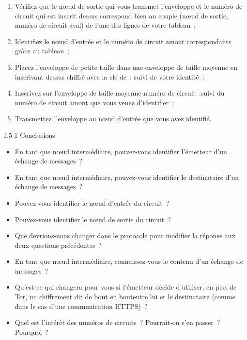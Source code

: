 \documentclass[a4paper,twoside,french]{article}
\makeatletter
\renewcommand\section{\@startsection
  {section}{1}{1cm}%
  {1.5\baselineskip}%
  {1\baselineskip}%
  {\normalfont\Large\bfseries}}%
\makeatother
\begin{document}
  \begin{enumerate}
  \item Vérifiez que le n\oe ud de sortie qui vous transmet
    l'enveloppe et le numéro de circuit qui est inscrit dessus
    correspond bien au couple (n\oe ud de sortie, numéro de circuit
    aval) de l'une des lignes de votre tableau~;
  \item Identifiez le n\oe ud d'entrée et le numéro de circuit amont
    correspondants grâce au tableau~;
  \item Placez l'enveloppe de petite taille dans une enveloppe de
    taille moyenne en inscrivant dessus \og chiffré avec la clé de~:
    \fg suivi de votre identité~;
  \item Inscrivez sur l'enveloppe de taille moyenne \og numéro de
    circuit~:\fg suivi du numéro de circuit amont que vous venez
    d'identifier~;
  \item Transmettez l'enveloppe au n\oe ud d'entrée que vous avez
    identifié.
  \end{enumerate}

  \section{Conclusions}

  \begin{itemize}
  \item En tant que n\oe ud intermédiaire, pouvez-vous identifier
    l'émetteur d'un échange de messages~?
  \item En tant que n\oe ud intermédiaire, pouvez-vous identifier
    le destinataire d'un échange de messages~?
  \item Pouvez-vous identifier le n\oe ud d'entrée du circuit~?
  \item Pouvez-vous identifier le n\oe ud de sortie du circuit~?
  \item Que devrions-nous changer dans le protocole pour modifier la
    réponse aux deux questions précédentes~?
  \item En tant que n\oe ud intermédiaire, connaissez-vous le contenu
    d'un échange de messages~?
  \item Qu'est-ce qui changera pour vous si l'émetteur décide
    d'utiliser, en plus de Tor, un chiffrement dit \og de bout en
    bout\fg entre lui et le destinataire (comme dans le cas d'une
    communication HTTPS)~?
  \item Quel est l'intérêt des numéros de circuits~? Pourrait-on s'en
    passer~? Pourquoi~?
  \end{itemize}
  
\end{document}
